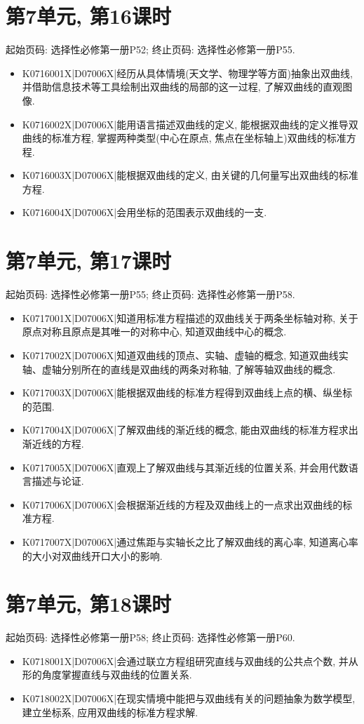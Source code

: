 \section*{第7单元, 第16课时}
起始页码: 选择性必修第一册P52; 终止页码: 选择性必修第一册P55.
\begin{itemize}
\item K0716001X|D07006X|经历从具体情境(天文学、物理学等方面)抽象出双曲线, 并借助信息技术等工具绘制出双曲线的局部的这一过程, 了解双曲线的直观图像.
\item K0716002X|D07006X|能用语言描述双曲线的定义, 能根据双曲线的定义推导双曲线的标准方程, 掌握两种类型(中心在原点, 焦点在坐标轴上)双曲线的标准方程.
\item K0716003X|D07006X|能根据双曲线的定义, 由关键的几何量写出双曲线的标准方程.
\item K0716004X|D07006X|会用坐标的范围表示双曲线的一支.
\end{itemize}

\section*{第7单元, 第17课时}
起始页码: 选择性必修第一册P55; 终止页码: 选择性必修第一册P58.
\begin{itemize}
\item K0717001X|D07006X|知道用标准方程描述的双曲线关于两条坐标轴对称, 关于原点对称且原点是其唯一的对称中心, 知道双曲线中心的概念.
\item K0717002X|D07006X|知道双曲线的顶点、实轴、虚轴的概念, 知道双曲线实轴、虚轴分别所在的直线是双曲线的两条对称轴, 了解等轴双曲线的概念.
\item K0717003X|D07006X|能根据双曲线的标准方程得到双曲线上点的横、纵坐标的范围.
\item K0717004X|D07006X|了解双曲线的渐近线的概念, 能由双曲线的标准方程求出渐近线的方程.
\item K0717005X|D07006X|直观上了解双曲线与其渐近线的位置关系, 并会用代数语言描述与论证.
\item K0717006X|D07006X|会根据渐近线的方程及双曲线上的一点求出双曲线的标准方程.
\item K0717007X|D07006X|通过焦距与实轴长之比了解双曲线的离心率, 知道离心率的大小对双曲线开口大小的影响.
\end{itemize}

\section*{第7单元, 第18课时}
起始页码: 选择性必修第一册P58; 终止页码: 选择性必修第一册P60.
\begin{itemize}
\item K0718001X|D07006X|会通过联立方程组研究直线与双曲线的公共点个数, 并从形的角度掌握直线与双曲线的位置关系.
\item K0718002X|D07006X|在现实情境中能把与双曲线有关的问题抽象为数学模型, 建立坐标系, 应用双曲线的标准方程求解.
\end{itemize}

